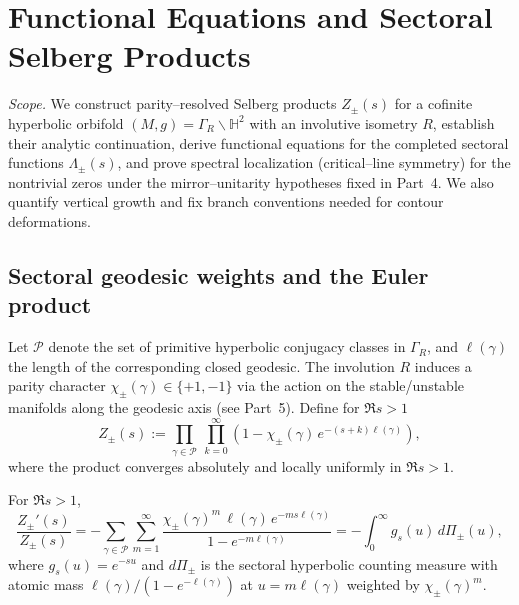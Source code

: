 \section{Functional Equations and Sectoral Selberg Products}
\label{sec:ch6-part7-functional} \relax \hspace{0pt}
\FlowBreaker
\noindent\emph{Scope.} We construct parity–resolved Selberg products $Z_\pm(s)$ for a cofinite hyperbolic orbifold $(M,g)=\Gamma_R\backslash\mathbb H^2$ with an involutive isometry $R$, establish their analytic continuation, derive functional equations for the completed sectoral functions $\Lambda_\pm(s)$, and prove spectral localization (critical–line symmetry) for the nontrivial zeros under the mirror–unitarity hypotheses fixed in Part~4. We also quantify vertical growth and fix branch conventions needed for contour deformations.  %


\subsection{Sectoral geodesic weights and the Euler product}
\label{subsec:ch6-part7-euler} \relax \hspace{0pt}
Let $\mathcal P$ denote the set of primitive hyperbolic conjugacy classes in $\Gamma_R$, and $\ell(\gamma)$ the length of the corresponding closed geodesic. The involution $R$ induces a parity character $\chi_\pm(\gamma)\in\{+1,-1\}$ via the action on the stable/unstable manifolds along the geodesic axis (see Part~5). Define for $\Re s>1$
\[
Z_\pm(s)
:= \prod_{\gamma\in\mathcal P}\ \prod_{k=0}^{\infty}
\left(1-\chi_\pm(\gamma)\,e^{-(s+k)\ell(\gamma)}\right),
\]
where the product converges absolutely and locally uniformly in $\Re s>1$.  %

\begin{lemma}
\label{lem:log-der}
For $\Re s>1$,
\[
\frac{Z_\pm'(s)}{Z_\pm(s)}
= -\sum_{\gamma\in\mathcal P}\sum_{m=1}^{\infty}
\frac{\chi_\pm(\gamma)^m\,\ell(\gamma)\,e^{-ms\ell(\gamma)}}{1-e^{-m\ell(\gamma)}}
= -\int_0^\infty g_s(u)\,d\Pi_\pm(u),
\]
where $g_s(u)=e^{-su}$ and $d\Pi_\pm$ is the sectoral hyperbolic counting measure with atomic mass $\ell(\gamma)/(1-e^{-\ell(\gamma)})$ at $u=m\ell(\gamma)$ weighted by $\chi_\pm(\gamma)^m$.  %
\end{lemma}

